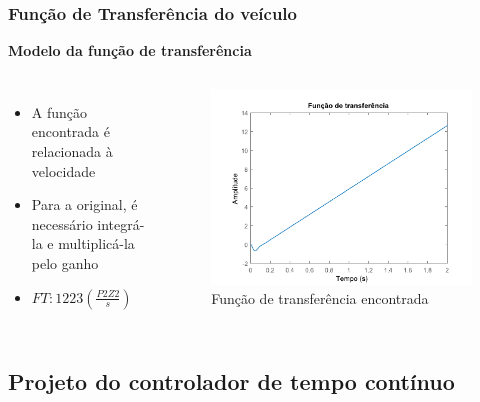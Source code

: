 \begin{frame}
\frametitle{Função de Transferência do veículo}
\textbf{Modelo da função de transferência}\\
	
\begin{columns}

 	\begin{itemize}
 	\item A função encontrada é relacionada à velocidade
 	\item Para a original, é necessário integrá-la e multiplicá-la pelo ganho
 	\item $FT: 1223(\frac{P2Z2}{s})$
	\end{itemize} 		

	\begin{figure}[th]
	\centering
	\captionsetup{width=0.85\textwidth,font=footnotesize,textfont=bf}
	\includegraphics[width=\linewidth,keepaspectratio]{Figuras/planta2v2.pdf}
	\caption{Função de transferência encontrada}				
	\end{figure}
	
\end{columns}
\end{frame}

\subsection{Projeto do controlador de tempo contínuo}


